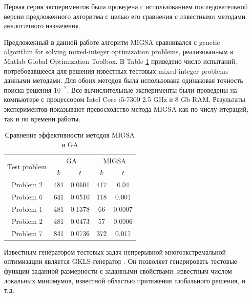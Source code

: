 \documentclass[
11pt,%
tightenlines,%
twoside,%
onecolumn,%
nofloats,%
nobibnotes,%
nofootinbib,%
superscriptaddress,%
noshowpacs,%
centertags]%
{revtex4}
\begin{document}
Первая серия экспериментов была проведена с использованием последовательной версии предложенного алгоритма с целью его сравнения с известными методами аналогичного назначения.

Предложенный в данной работе алгоритм MIGSA сравнивался с genetic algorithm for solving mixed-integer optimization problems, реализованным в Matlab Global Optimization Toolbox. В Table \ref{tab:1} приведено число испытаний, потребовавшееся для решения известных тестовых mixed-integer problems данными методами. Для обоих методов была использована одинаковая точность поиска решения $10^{-2}$. Все вычислительные эксперименты были проведены на компьютере с процессором Intel Core i5-7300 2.5 GHz и 8 Gb RAM. Результаты экспериментов показывают превосходство метода MIGSA как по числу итераций, так и по времени работы.

\begin{table}
	\caption{Сравнение эффективности методов MIGSA и GA}
	\label{tab:1}
	\center
	\begin{tabular}{|c|c|c|c|c|}
		\hline
	\multirow{2}{*}{Test problem}	 & \multicolumn{2}{c|}{ GA } &  \multicolumn{2}{c|}{MIGSA} \\
		\cline{2-3} \cline{4-5} 
		 & $k$ & $t$ &  $k$ & $t$  \\
		\hline 
		 Problem 2 \cite{Floudas}&	481 &	0.0601 & 	417 &	0.04 \\
		 Problem 6 \cite{Floudas}&	641 &	0.0510 & 	118 &	0.001 \\
		 Problem 1 \cite{Deep}   &	481 &	0.1378 & 	66 &	0.0007 \\
		 Problem 2 \cite{Deep}   &	481 &	0.0473 & 	57 &	0.0006 \\
		 Problem 7 \cite{Deep}   &	841 &	0.0736 &  372	 &	0.017 \\
		\hline
	\end{tabular}
\end{table}	




Известным генератором тестовых задач непрерывной многоэкстремальной оптимизации является GKLS-генератор \cite{Gaviano}. Он позволяет генерировать тестовые функции заданной размерности с заданными свойствами: известным числом локальных минимумов, известной областью притяжения глобального решения, и т.д.  
\end{document}
